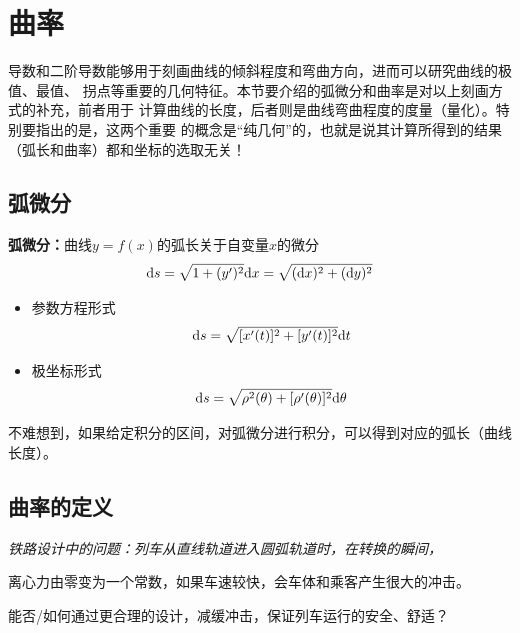 \section{曲率}

导数和二阶导数能够用于刻画曲线的倾斜程度和弯曲方向，进而可以研究曲线的极值、最值、
拐点等重要的几何特征。本节要介绍的弧微分和曲率是对以上刻画方式的补充，前者用于
计算曲线的长度，后者则是曲线弯曲程度的度量（量化）。特别要指出的是，这两个重要
的概念是“纯几何”的，也就是说其计算所得到的结果（弧长和曲率）都和坐标的选取无关！

\subsection{弧微分}

\begin{thx}
	{\bf 弧微分：}曲线$y=f(x)$的弧长关于自变量$x$的微分
	$$\mathrm{d} s=\sqrt{1+(y')^2}\mathrm{d} x =\sqrt{(\mathrm{d} x)^2+(\mathrm{d} y)^2}$$
	\begin{itemize}
	  \item 参数方程形式 
	  $$\mathrm{d} s=\sqrt{[x'(t)]^2+[y'(t)]^2}\mathrm{d} t$$ 
	  \vspace{-3ex}
	  \item 极坐标形式 
	  $$\mathrm{d} s=\sqrt{\rho^2(\theta)+[\rho'(\theta)]^2}\mathrm{d}\theta$$
	\end{itemize}
\end{thx}
不难想到，如果给定积分的区间，对弧微分进行积分，可以得到对应的弧长（曲线长度）。

\subsection{曲率的定义}

\begin{center}
	
	{\it 铁路设计中的问题：列车从直线轨道进入圆弧轨道时，在转换的瞬间，
	
	离心力由零变为一个常数，如果车速较快，会车体和乘客产生很大的冲击。
	
	能否/如何通过更合理的设计，减缓冲击，保证列车运行的安全、舒适？}
\end{center}

